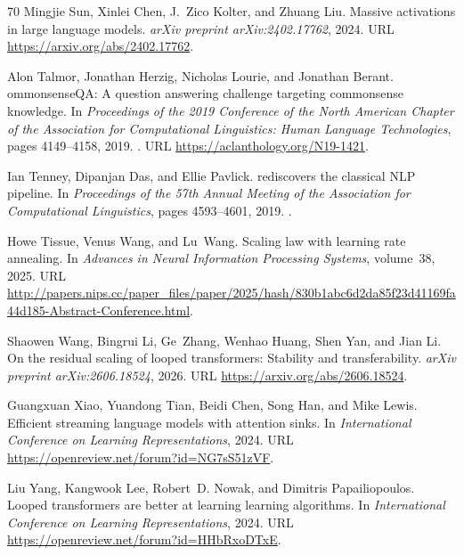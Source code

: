 \documentclass[]{bytedance_seed}
\theoremstyle{definition}
\theoremstyle{remark}
\begin{document}
\begin{thebibliography}{70}
Mingjie Sun, Xinlei Chen, J.~Zico Kolter, and Zhuang Liu.
\newblock Massive activations in large language models.
\newblock \emph{arXiv preprint arXiv:2402.17762}, 2024.
\newblock URL \url{https://arxiv.org/abs/2402.17762}.

Alon Talmor, Jonathan Herzig, Nicholas Lourie, and Jonathan Berant.
ommonsense{QA}: A question answering challenge targeting
  commonsense knowledge.
\newblock In \emph{Proceedings of the 2019 Conference of the North American
  Chapter of the Association for Computational Linguistics: Human Language
  Technologies}, pages 4149--4158, 2019.
\newblock {}.
\newblock URL \url{https://aclanthology.org/N19-1421}.

Ian Tenney, Dipanjan Das, and Ellie Pavlick.
 rediscovers the classical {NLP} pipeline.
\newblock In \emph{Proceedings of the 57th Annual Meeting of the Association
  for Computational Linguistics}, pages 4593--4601, 2019.
\newblock {}.

Howe Tissue, Venus Wang, and Lu~Wang.
\newblock Scaling law with learning rate annealing.
\newblock In \emph{Advances in Neural Information Processing Systems},
  volume~38, 2025.
\newblock URL
  \url{http://papers.nips.cc/paper_files/paper/2025/hash/830b1abc6d2da85f23d41169fa44d185-Abstract-Conference.html}.

Shaowen Wang, Bingrui Li, Ge~Zhang, Wenhao Huang, Shen Yan, and Jian Li.
\newblock On the residual scaling of looped transformers: Stability and
  transferability.
\newblock \emph{arXiv preprint arXiv:2606.18524}, 2026.
\newblock URL \url{https://arxiv.org/abs/2606.18524}.

Guangxuan Xiao, Yuandong Tian, Beidi Chen, Song Han, and Mike Lewis.
\newblock Efficient streaming language models with attention sinks.
\newblock In \emph{International Conference on Learning Representations}, 2024.
\newblock URL \url{https://openreview.net/forum?id=NG7sS51zVF}.

Liu Yang, Kangwook Lee, Robert~D. Nowak, and Dimitris Papailiopoulos.
\newblock Looped transformers are better at learning learning algorithms.
\newblock In \emph{International Conference on Learning Representations}, 2024.
\newblock URL \url{https://openreview.net/forum?id=HHbRxoDTxE}.


\end{thebibliography}
\end{document}
